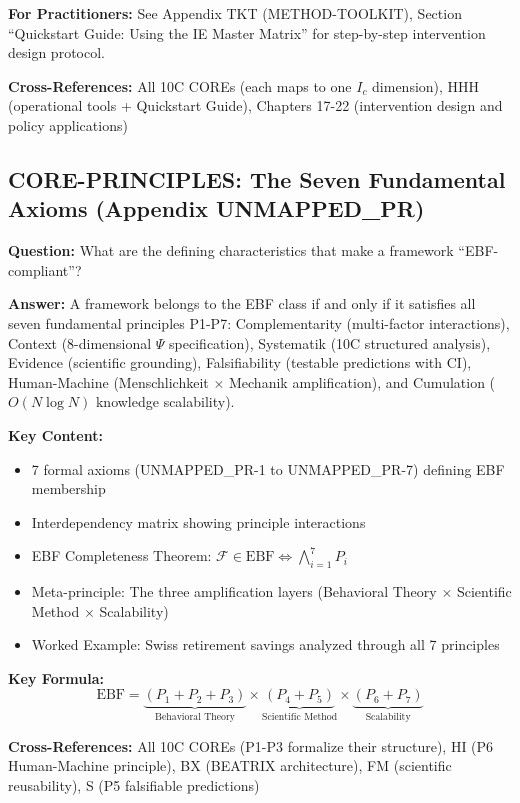 \begin{tcolorbox}[colback=gray!5!white, colframe=gray!75!black]
\textbf{For Practitioners:} See Appendix TKT (METHOD-TOOLKIT), Section ``Quickstart Guide: Using the IE Master Matrix'' for step-by-step intervention design protocol.

\textbf{Cross-References:} All 10C COREs (each maps to one $I_c$ dimension), HHH (operational tools + Quickstart Guide), Chapters 17-22 (intervention design and policy applications)
\end{tcolorbox}

\subsection{CORE-PRINCIPLES: The Seven Fundamental Axioms (Appendix UNMAPPED_PR)}

\begin{tcolorbox}[colback=gray!5!white, colframe=gray!75!black]
\textbf{Question:} What are the defining characteristics that make a framework ``EBF-compliant''?

\textbf{Answer:} A framework belongs to the EBF class if and only if it satisfies all seven fundamental principles P1-P7: Complementarity (multi-factor interactions), Context (8-dimensional $\Psi$ specification), Systematik (10C structured analysis), Evidence (scientific grounding), Falsifiability (testable predictions with CI), Human-Machine (Menschlichkeit $\times$ Mechanik amplification), and Cumulation ($O(N \log N)$ knowledge scalability).

\textbf{Key Content:}
\begin{itemize}[nosep]
\item 7 formal axioms (UNMAPPED_PR-1 to UNMAPPED_PR-7) defining EBF membership
\item Interdependency matrix showing principle interactions
\item EBF Completeness Theorem: $\mathcal{F} \in \text{EBF} \Leftrightarrow \bigwedge_{i=1}^{7} P_i$
\item Meta-principle: The three amplification layers (Behavioral Theory $\times$ Scientific Method $\times$ Scalability)
\item Worked Example: Swiss retirement savings analyzed through all 7 principles
\end{itemize}

\textbf{Key Formula:}
\begin{equation}
\text{EBF} = \underbrace{(P_1 + P_2 + P_3)}_{\text{Behavioral Theory}} \times \underbrace{(P_4 + P_5)}_{\text{Scientific Method}} \times \underbrace{(P_6 + P_7)}_{\text{Scalability}}
\end{equation}

\textbf{Cross-References:} All 10C COREs (P1-P3 formalize their structure), HI (P6 Human-Machine principle), BX (BEATRIX architecture), FM (scientific reusability), S (P5 falsifiable predictions)
\end{tcolorbox}

